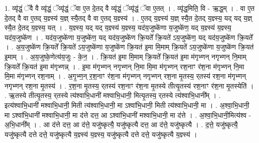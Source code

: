 \documentclass[17pt]{extarticle}
\begin{document}
1. व्यृ॑द्धं॒ ॅवै वै व्यृ॑द्धं॒ ॅव्यृ॑द्धं॒ ॅवा ए॒त दे॒तद् वै व्यृ॑द्धं॒ ॅव्यृ॑द्धं॒ ॅवा ए॒तत् । . व्यृ॑द्ध॒मिति॒ वि - ऋ॒द्ध॒म् । . वा ए॒त दे॒तद् वै वा ए॒तद् य॒ज्ञ्स्य॑ य॒ज्ञ् स्यै॒तद् वै वा ए॒तद् य॒ज्ञ्स्य॑ । . ए॒तद् य॒ज्ञ्स्य॑ य॒ज्ञ् स्यै॒त दे॒तद् य॒ज्ञ्स्य॒ यद् यद् य॒ज्ञ् स्यै॒त दे॒तद् य॒ज्ञ्स्य॒ यत् । . य॒ज्ञ्स्य॒ यद् यद् य॒ज्ञ्स्य॑ य॒ज्ञ्स्य॒ यद॑य॒जुष्के॑णा य॒जुष्के॑ण॒ यद् य॒ज्ञ्स्य॑ य॒ज्ञ्स्य॒ यद॑य॒जुष्के॑ण । . यद॑य॒जुष्के॑णा य॒जुष्के॑ण॒ यद् यद॑य॒जुष्के॑ण क्रि॒यते᳚ क्रि॒यते॑ ऽय॒जुष्के॑ण॒ यद् यद॑य॒जुष्के॑ण क्रि॒यते᳚ । . अ॒य॒जुष्के॑ण क्रि॒यते᳚ क्रि॒यते॑ ऽय॒जुष्के॑णा य॒जुष्के॑ण क्रि॒यत॑ इ॒मा मि॒माम् क्रि॒यते॑ ऽय॒जुष्के॑णा य॒जुष्के॑ण क्रि॒यत॑ इ॒माम् । . अ॒य॒जुष्के॒णेत्य॑य॒जुः - के॒न॒ । . क्रि॒यत॑ इ॒मा मि॒माम् क्रि॒यते᳚ क्रि॒यत॑ इ॒मा म॑गृभ्णन् नगृभ्णन् नि॒माम् क्रि॒यते᳚ क्रि॒यत॑ इ॒मा म॑गृभ्णन्न् । . इ॒मा म॑गृभ्णन् नगृभ्णन् नि॒मा मि॒मा म॑गृभ्णन् रश॒नाꣳ र॑श॒ना म॑गृभ्णन् नि॒मा मि॒मा म॑गृभ्णन् रश॒नाम् । . अ॒गृ॒भ्ण॒न् र॒श॒नाꣳ र॑श॒ना म॑गृभ्णन् नगृभ्णन् रश॒ना मृ॒तस्य॒ र्‌तस्य॑ रश॒ना म॑गृभ्णन् नगृभ्णन् रश॒ना मृ॒तस्य॑ । . र॒श॒ना मृ॒तस्य॒ र्‌तस्य॑ रश॒नाꣳ र॑श॒ना मृ॒तस्ये तीत्यृ॒तस्य॑ रश॒नाꣳ र॑श॒ना मृ॒तस्येति॑ । . ऋ॒तस्ये तीत्यृ॒तस्य॒ र्‌तस्ये त्य॑श्वाभि॒धानी॑ मश्वाभि॒धानी॒ मित्यृ॒तस्य॒ र्‌तस्ये त्य॑श्वाभि॒धानी᳚म् । . इत्य॑श्वाभि॒धानी॑ मश्वाभि॒धानी॒ मिती त्य॑श्वाभि॒धानी॒ मा ऽश्वा॑भि॒धानी॒ मिती त्य॑श्वाभि॒धानी॒ मा । . अ॒श्वा॒भि॒धानी॒ मा ऽश्वा॑भि॒धानी॑ मश्वाभि॒धानी॒ मा द॑त्ते दत्त॒ आ ऽश्वा॑भि॒धानी॑ मश्वाभि॒धानी॒ मा द॑त्ते । . अ॒श्वा॒भि॒धानी॒मित्य॑श्व - अ॒भि॒धानी᳚म् । . आ द॑त्ते दत्त॒ आ द॑त्ते॒ यजु॑ष्कृत्यै॒ यजु॑ष्कृत्यै दत्त॒ आ द॑त्ते॒ यजु॑ष्कृत्यै । . द॒त्ते॒ यजु॑ष्कृत्यै॒ यजु॑ष्कृत्यै दत्ते दत्ते॒ यजु॑ष्कृत्यै य॒ज्ञ्स्य॑ य॒ज्ञ्स्य॒ यजु॑ष्कृत्यै दत्ते दत्ते॒ यजु॑ष्कृत्यै य॒ज्ञ्स्य॑ । \newline
\end{document}
